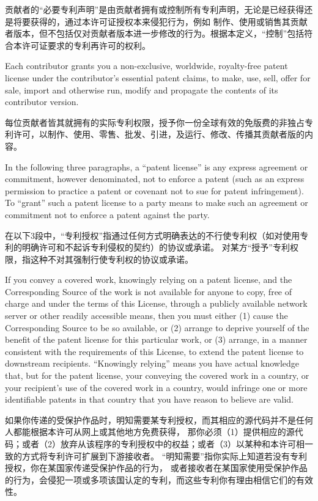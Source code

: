\documentclass[11pt]{article}
\begin{document}
\begin{enumerate}
        贡献者的“必要专利声明”是由贡献者拥有或控制所有专利声明，无论是已经获得还是将要获得的，通过本许可证授权本来侵犯行为，例如
        制作、使用或销售其贡献者版本，但不包括仅对贡献者版本进一步修改的行为。根据本定义，“控制”包括符合本许可证要求的专利再许可的权利。

        Each contributor grants you a non-exclusive, worldwide, royalty-free
        patent license under the contributor's essential patent claims, to
        make, use, sell, offer for sale, import and otherwise run, modify and
        propagate the contents of its contributor version.

        每位贡献者皆其就拥有的实际专利权限，授予你一份全球有效的免版费的非独占专利许可，以制作、使用、零售、批发、引进，及运行、修改、传播其贡献者版的内容。

        In the following three paragraphs, a ``patent license'' is any express
        agreement or commitment, however denominated, not to enforce a patent
        (such as an express permission to practice a patent or covenant not to
        sue for patent infringement).  To ``grant'' such a patent license to a
        party means to make such an agreement or commitment not to enforce a
        patent against the party.

        在以下3段中，“专利授权”指通过任何方式明确表达的不行使专利权（如对使用专利的明确许可和不起诉专利侵权的契约）的协议或承诺。
        对某方“授予”专利权限，指这种不对其强制行使专利权的协议或承诺。

        If you convey a covered work, knowingly relying on a patent license,
        and the Corresponding Source of the work is not available for anyone
        to copy, free of charge and under the terms of this License, through a
        publicly available network server or other readily accessible means,
        then you must either (1) cause the Corresponding Source to be so
        available, or (2) arrange to deprive yourself of the benefit of the
        patent license for this particular work, or (3) arrange, in a manner
        consistent with the requirements of this License, to extend the patent
        license to downstream recipients.  ``Knowingly relying'' means you have
        actual knowledge that, but for the patent license, your conveying the
        covered work in a country, or your recipient's use of the covered work
        in a country, would infringe one or more identifiable patents in that
        country that you have reason to believe are valid.

        如果你传递的受保护作品时，明知需要某专利授权，而其相应的源代码并不是任何人都能根据本许可从网上或其他地方免费获得，
        那你必须（1）提供相应的源代码；或者（2）放弃从该程序的专利授权中的权益；或者（3）以某种和本许可相一致的方式将专利许可扩展到下游接收者。
        “明知需要”指你实际上知道若没有专利授权，你在某国家传递受保护作品的行为，
        或者接收者在某国家使用受保护作品的行为，会侵犯一项或多项该国认定的专利，而这些专利你有理由相信它们的有效性。


\end{enumerate}
\end{document}
